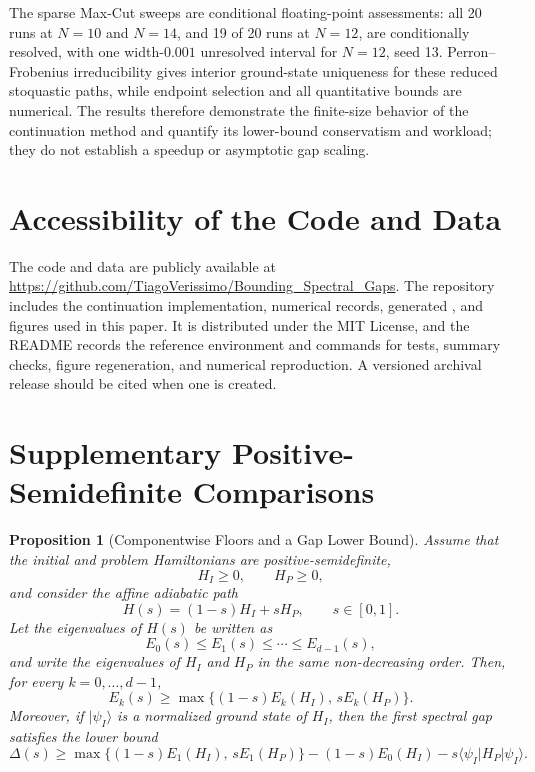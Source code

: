 \documentclass[11pt, a4paper]{article}
\newtheorem{proposition}[theorem]{Proposition}
\newcommand{\ket}[1]{| #1 \rangle}
\newcommand{\opvalue}[3]{\langle #1 | #2 | #3 \rangle}
\begin{document}
The sparse Max-Cut sweeps are conditional floating-point assessments: all 20 runs at $N=10$ and $N=14$, and 19 of 20 runs at $N=12$, are conditionally resolved, with one width-$0.001$ unresolved interval for $N=12$, seed 13. Perron--Frobenius irreducibility gives interior ground-state uniqueness for these reduced stoquastic paths, while endpoint selection and all quantitative bounds are numerical. The results therefore demonstrate the finite-size behavior of the continuation method and quantify its lower-bound conservatism and workload; they do not establish a speedup or asymptotic gap scaling.

\section{Accessibility of the Code and Data}

The code and data are publicly available at \url{https://github.com/TiagoVerissimo/Bounding_Spectral_Gaps}. The repository includes the continuation implementation, numerical records, generated , and figures used in this paper. It is distributed under the MIT License, and the README records the reference environment and commands for tests, summary checks, figure regeneration, and numerical reproduction. A versioned archival release should be cited when one is created.


\appendix
\section{Supplementary Positive-Semidefinite Comparisons}
\label{app:psd-comparisons}

\begin{proposition}[Componentwise Floors and a Gap Lower Bound]
\label{prop:componentwise-floors}
Assume that the initial and problem Hamiltonians are positive-semidefinite,
\begin{equation}
H_I\ge 0,
\qquad
H_P\ge 0,
\end{equation}
and consider the affine adiabatic path
\begin{equation}
H(s)=(1-s)H_I+sH_P,
\qquad s\in[0,1].
\end{equation}
Let the eigenvalues of $H(s)$ be written as
\begin{equation}
E_0(s)\le E_1(s)\le \cdots \le E_{d-1}(s),
\end{equation}
and write the eigenvalues of $H_I$ and $H_P$ in the same non-decreasing order. Then, for every $k=0,\dots,d-1$,
\begin{equation}
\label{eq:componentwise-floor}
E_k(s)
\ge
\max\{(1-s)E_k(H_I),\,sE_k(H_P)\}.
\end{equation}
Moreover, if $\ket{\psi_I}$ is a normalized ground state of $H_I$, then the first spectral gap satisfies the lower bound
\begin{equation}
\label{eq:psd-gap-bound}
\Delta(s)
\ge
\max\{(1-s)E_1(H_I),\,sE_1(H_P)\}
-(1-s)E_0(H_I)-s\opvalue{\psi_I}{H_P}{\psi_I}.
\end{equation}
\end{proposition}
\end{document}
